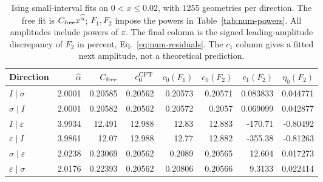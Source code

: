 \begin{table}[htbp]\centering\footnotesize
\setlength{\tabcolsep}{3.5pt}
\begin{tabular}{lrrrrrrr}\toprule
Direction & $\widehat\alpha$ & $C_{\rm free}$ & $c_0^{\rm CFT}$ & $c_0(F_1)$ & $c_0(F_2)$ & $c_1(F_2)$ & $\eta_0(F_2)$\\\midrule
$I\mid \sigma$ & 2.0001 & 0.20585 & 0.20562 & 0.20573 & 0.20571 & 0.083833 & 0.044771\\
$\sigma\mid I$ & 2.0001 & 0.20582 & 0.20562 & 0.20572 & 0.2057 & 0.069099 & 0.042877\\
$I\mid \varepsilon$ & 3.9934 & 12.491 & 12.988 & 12.83 & 12.883 & -170.71 & -0.80492\\
$\varepsilon\mid I$ & 3.9861 & 12.07 & 12.988 & 12.77 & 12.882 & -355.38 & -0.81263\\
$\sigma\mid \varepsilon$ & 2.0238 & 0.23069 & 0.20562 & 0.2089 & 0.20565 & 12.604 & 0.017273\\
$\varepsilon\mid \sigma$ & 2.0176 & 0.22393 & 0.20562 & 0.20806 & 0.20566 & 9.3133 & 0.022414\\
\bottomrule\end{tabular}
\caption{Ising small-interval fits on $0<x\leq0.02$, with 1255 geometries per direction. The free fit is $C_{\rm free}x^{\widehat\alpha}$; $F_1,F_2$ impose the powers in Table~\ref{tab:num-powers}. All amplitudes include powers of $\pi$. The final column is the signed leading-amplitude discrepancy of $F_2$ in percent, Eq.~\eqref{eq:num-residuals}. The $c_1$ column gives a fitted next amplitude, not a theoretical prediction.}
\label{tab:num-ising-small}
\end{table}
